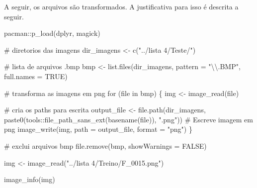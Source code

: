 \documentclass[
  a4paperpaper,
]{article}
\newenvironment{Shaded}{\begin{snugshade}}{\end{snugshade}}
\newcommand{\AttributeTok}[1]{\textcolor[rgb]{0.40,0.45,0.13}{#1}}
\newcommand{\CommentTok}[1]{\textcolor[rgb]{0.37,0.37,0.37}{#1}}
\newcommand{\ConstantTok}[1]{\textcolor[rgb]{0.56,0.35,0.01}{#1}}
\newcommand{\ControlFlowTok}[1]{\textcolor[rgb]{0.00,0.23,0.31}{#1}}
\newcommand{\FunctionTok}[1]{\textcolor[rgb]{0.28,0.35,0.67}{#1}}
\newcommand{\NormalTok}[1]{\textcolor[rgb]{0.00,0.23,0.31}{#1}}
\newcommand{\OtherTok}[1]{\textcolor[rgb]{0.00,0.23,0.31}{#1}}
\newcommand{\SpecialCharTok}[1]{\textcolor[rgb]{0.37,0.37,0.37}{#1}}
\newcommand{\StringTok}[1]{\textcolor[rgb]{0.13,0.47,0.30}{#1}}
\begin{document}
A seguir, os arquivos são transformados. A justificativa para isso é
descrita a seguir.

\begin{Shaded}
\begin{Highlighting}[]
\NormalTok{pacman}\SpecialCharTok{::}\FunctionTok{p\_load}\NormalTok{(dplyr, magick)}
\end{Highlighting}
\end{Shaded}

\begin{Shaded}
\begin{Highlighting}[]
\CommentTok{\# diretorios das imagens}
\NormalTok{dir\_imagens }\OtherTok{\textless{}{-}} \FunctionTok{c}\NormalTok{(}\StringTok{"../lista 4/Teste/"}\NormalTok{)}

\CommentTok{\# lista de arquivos .bmp}
\NormalTok{bmp }\OtherTok{\textless{}{-}} \FunctionTok{list.files}\NormalTok{(dir\_imagens, }\AttributeTok{pattern =} \StringTok{"}\SpecialCharTok{\textbackslash{}\textbackslash{}}\StringTok{.BMP"}\NormalTok{, }\AttributeTok{full.names =} \ConstantTok{TRUE}\NormalTok{)}

\CommentTok{\# transforma as imagens em png}
\ControlFlowTok{for}\NormalTok{ (file }\ControlFlowTok{in}\NormalTok{ bmp) \{}
\NormalTok{  img }\OtherTok{\textless{}{-}} \FunctionTok{image\_read}\NormalTok{(file)}
  
  \CommentTok{\# cria os paths para escrita}
\NormalTok{  output\_file }\OtherTok{\textless{}{-}} \FunctionTok{file.path}\NormalTok{(dir\_imagens, }\FunctionTok{paste0}\NormalTok{(tools}\SpecialCharTok{::}\FunctionTok{file\_path\_sans\_ext}\NormalTok{(}\FunctionTok{basename}\NormalTok{(file)), }\StringTok{".png"}\NormalTok{))}
  \CommentTok{\# Escreve imagem em png}
  \FunctionTok{image\_write}\NormalTok{(img, }\AttributeTok{path =}\NormalTok{ output\_file, }\AttributeTok{format =} \StringTok{"png"}\NormalTok{)}
\NormalTok{\}}

\CommentTok{\# exclui arquivos bmp}
\FunctionTok{file.remove}\NormalTok{(bmp, }\AttributeTok{showWarnings =} \ConstantTok{FALSE}\NormalTok{)}
\end{Highlighting}
\end{Shaded}

\begin{Shaded}
\begin{Highlighting}[]
\NormalTok{img }\OtherTok{\textless{}{-}} \FunctionTok{image\_read}\NormalTok{(}\StringTok{"../lista 4/Treino/F\_0015.png"}\NormalTok{)}

\FunctionTok{image\_info}\NormalTok{(img)}
\end{Highlighting}
\end{Shaded}
\end{document}
